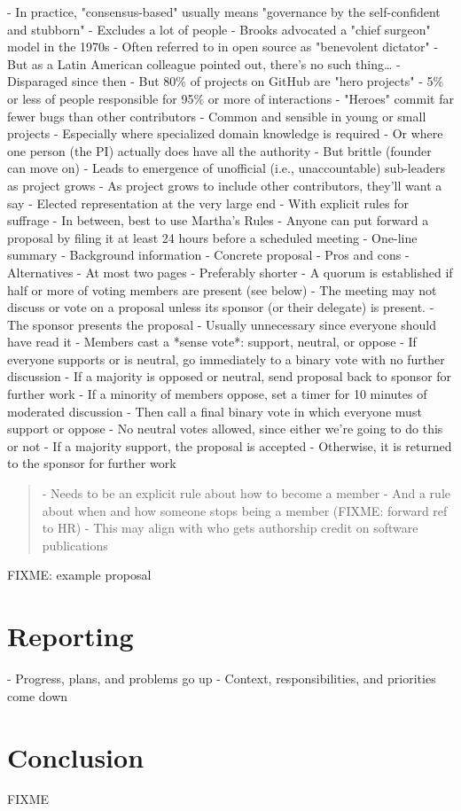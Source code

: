 \documentclass[10pt,letterpaper]{article}
\begin{document}
- In practice, "consensus-based" usually means "governance by the self-confident and stubborn"
  - Excludes a lot of people
- Brooks advocated a "chief surgeon" model in the 1970s \cite{Brooks1995}
  - Often referred to in open source as "benevolent dictator"
  - But as a Latin American colleague pointed out, there's no such thing{\ldots}
- Disparaged since then
  - But 80\% of projects on GitHub are "hero projects" \cite{Majumder2019}
  - 5\% or less of people responsible for 95\% or more of interactions
  - "Heroes" commit far fewer bugs than other contributors
- Common and sensible in young or small projects
  - Especially where specialized domain knowledge is required
  - Or where one person (the PI) actually does have all the authority
  - But brittle (founder can move on)
  - Leads to emergence of unofficial (i.e., unaccountable) sub-leaders as project grows
  - As project grows to include other contributors, they'll want a say
- Elected representation at the very large end
  - With explicit rules for suffrage
- In between, best to use Martha's Rules \cite{Minahan1986}
- Anyone can put forward a proposal by filing it at least 24 hours before a scheduled meeting
  - One-line summary
  - Background information
  - Concrete proposal
  - Pros and cons
  - Alternatives
- At most two pages
  - Preferably shorter
- A quorum is established if half or more of voting members are present (see below)
- The meeting may not discuss or vote on a proposal unless its sponsor (or their delegate) is present.
- The sponsor presents the proposal
  - Usually unnecessary since everyone should have read it
- Members cast a *sense vote*: support, neutral, or oppose
  - If everyone supports or is neutral, go immediately to a binary vote with no further discussion
  - If a majority is opposed or neutral, send proposal back to sponsor for further work
- If a minority of members oppose, set a timer for 10 minutes of moderated discussion
- Then call a final binary vote in which everyone must support or oppose
  - No neutral votes allowed, since either we're going to do this or not
- If a majority support, the proposal is accepted
  - Otherwise, it is returned to the sponsor for further work

\begin{quotation}
- Needs to be an explicit rule about how to become a member
  - And a rule about when and how someone stops being a member (FIXME: forward ref to HR)
- This may align with who gets authorship credit on software publications
\end{quotation}

FIXME: example proposal

\section{Reporting}

- Progress, plans, and problems go up
- Context, responsibilities, and priorities come down

\section*{Conclusion}

FIXME

\nocite{*}

\end{document}
